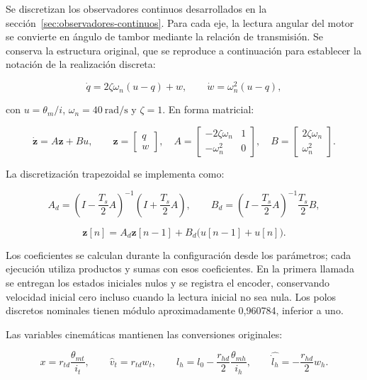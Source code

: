 \documentclass[a4paper,10pt,onecolumn,journal]{ieeeconf}
\numberwithin{equation}{section}
\begin{document}
Se discretizan los observadores continuos desarrollados en la sección~\ref{sec:observadores-continuos}. Para cada eje, la lectura angular del motor se convierte en ángulo de tambor mediante la relación de transmisión. Se conserva la estructura original, que se reproduce a continuación para establecer la notación de la realización discreta:

\begin{equation}
\dot q=2\zeta\omega_n(u-q)+w,\qquad
\dot w=\omega_n^2(u-q),
\end{equation}

con $u=\theta_m/i$, $\omega_n=40\ \mathrm{rad/s}$ y $\zeta=1$. En forma matricial:

\begin{equation}
\dot{\boldsymbol z}=A\boldsymbol z+Bu,\qquad
\boldsymbol z=\begin{bmatrix}q\\w\end{bmatrix},\quad
A=\begin{bmatrix}-2\zeta\omega_n&1\\-\omega_n^2&0\end{bmatrix},\quad
B=\begin{bmatrix}2\zeta\omega_n\\\omega_n^2\end{bmatrix}.
\end{equation}

La discretización trapezoidal se implementa como:

\begin{equation}
A_d=\left(I-\frac{T_s}{2}A\right)^{-1}\left(I+\frac{T_s}{2}A\right),\qquad
B_d=\left(I-\frac{T_s}{2}A\right)^{-1}\frac{T_s}{2}B,
\end{equation}

\begin{equation}
\boldsymbol z[n]=A_d\boldsymbol z[n-1]+B_d\big(u[n-1]+u[n]\big).
\end{equation}

Los coeficientes se calculan durante la configuración desde los parámetros; cada ejecución utiliza productos y sumas con esos coeficientes. En la primera llamada se entregan los estados iniciales nulos y se registra el encoder, conservando velocidad inicial cero incluso cuando la lectura inicial no sea nula. Los polos discretos nominales tienen módulo aproximadamente 0,960784, inferior a uno.

Las variables cinemáticas mantienen las conversiones originales:

\begin{equation}
x=r_{td}\frac{\theta_{mt}}{i_t},\qquad
\widehat v_t=r_{td}w_t,\qquad
l_h=l_0-\frac{r_{hd}}{2}\frac{\theta_{mh}}{i_h},\qquad
\widehat{\dot l_h}=-\frac{r_{hd}}{2}w_h.
\end{equation}
\end{document}
